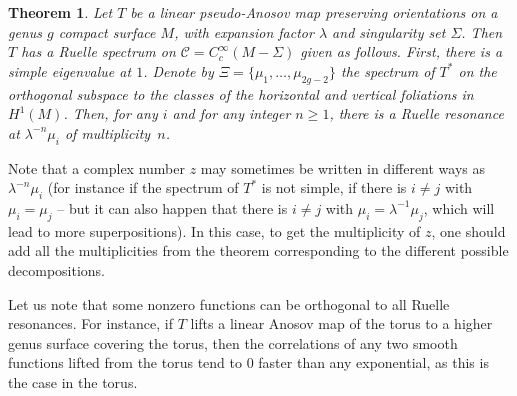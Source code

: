 \documentclass[JEP,XML,SOM,Unicode]{cedram}
\newcommand{\boC}{\mathcal{C}}
\newtheorem{thm}{Theorem}[section]
\theoremstyle{definition}
\numberwithin{equation}{section}
\begin{document}
\begin{thm}
\label{thm:main_preserves_orientations} Let $T$ be a linear pseudo-Anosov map
preserving orientations on a genus $g$ compact surface $M$, with expansion
factor $\lambda$ and singularity set $\Sigma$. Then $T$ has a Ruelle spectrum
on $\boC = C^\infty_c(M-\Sigma)$ given as follows. First, there is a simple
eigenvalue at $1$. Denote by $\Xi = \{\mu_1,\dotsc, \mu_{2g-2}\}$ the
spectrum of $T^*$ on the orthogonal subspace to the classes of the horizontal
and vertical foliations in $H^1(M)$. Then, for any $i$ and for any integer
$n\geq 1$, there is a Ruelle resonance at $\lambda^{-n} \mu_i$ of
multiplicity~$n$.
\end{thm}
Note that a complex number $z$ may sometimes be written in different ways as
$\lambda^{-n}\mu_i$ (for instance if the spectrum of $T^*$ is not simple,
\ie if there is $i\neq j$ with $\mu_i = \mu_j$ -- but it can also happen
that there is $i\neq j$ with $\mu_i = \lambda^{-1}\mu_j$, which will lead to
more superpositions). In this case, to get the multiplicity of $z$, one
should add all the multiplicities from the theorem corresponding to the
different possible decompositions.

Let us note that some nonzero functions can be orthogonal to all Ruelle resonances. For instance,
if $T$ lifts a linear Anosov map of the torus to a higher genus surface covering
the torus, then the correlations of any two smooth functions lifted from the torus
tend to $0$ faster than any exponential, as this is the case in the torus.
\end{document}
